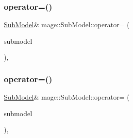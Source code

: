 \hypertarget{classmage_1_1_sub_model_aafc8b4ba509ec78ea36719e98b1a0c99}{}\label{classmage_1_1_sub_model_aafc8b4ba509ec78ea36719e98b1a0c99} 
\subsubsection{\texorpdfstring{operator=()}{operator=()}\hspace{0.1cm}{\footnotesize\ttfamily [1/2]}}
{\footnotesize\ttfamily \hyperlink{classmage_1_1_sub_model}{Sub\+Model}\& mage\+::\+Sub\+Model\+::operator= (\begin{DoxyParamCaption}\item[{const \hyperlink{classmage_1_1_sub_model}{Sub\+Model} \&}]{submodel }\end{DoxyParamCaption})\hspace{0.3cm}{\ttfamily [private]}, {\ttfamily [delete]}}

\hypertarget{classmage_1_1_sub_model_a616b8007e767deebc248485fb8d26773}{}\label{classmage_1_1_sub_model_a616b8007e767deebc248485fb8d26773} 
\subsubsection{\texorpdfstring{operator=()}{operator=()}\hspace{0.1cm}{\footnotesize\ttfamily [2/2]}}
{\footnotesize\ttfamily \hyperlink{classmage_1_1_sub_model}{Sub\+Model}\& mage\+::\+Sub\+Model\+::operator= (\begin{DoxyParamCaption}\item[{\hyperlink{classmage_1_1_sub_model}{Sub\+Model} \&\&}]{submodel }\end{DoxyParamCaption})\hspace{0.3cm}{\ttfamily [private]}, {\ttfamily [delete]}}

\hypertarget{classmage_1_1_sub_model_a9dbfc5690b63cbf77d3e1d2c9a87d07a}{}\label{classmage_1_1_sub_model_a9dbfc5690b63cbf77d3e1d2c9a87d07a} 
